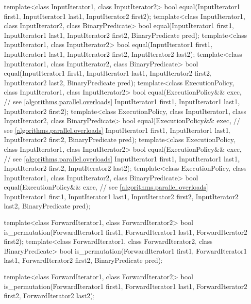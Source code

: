 \begin{codeblock}
{  template<class InputIterator1, class InputIterator2>
    bool equal(InputIterator1 first1, InputIterator1 last1,
               InputIterator2 first2);
  template<class InputIterator1, class InputIterator2, class BinaryPredicate>
    bool equal(InputIterator1 first1, InputIterator1 last1,
               InputIterator2 first2, BinaryPredicate pred);
  template<class InputIterator1, class InputIterator2>
    bool equal(InputIterator1 first1, InputIterator1 last1,
               InputIterator2 first2, InputIterator2 last2);
  template<class InputIterator1, class InputIterator2, class BinaryPredicate>
    bool equal(InputIterator1 first1, InputIterator1 last1,
               InputIterator2 first2, InputIterator2 last2,
               BinaryPredicate pred);
  template<class ExecutionPolicy, class InputIterator1, class InputIterator2>
    bool equal(ExecutionPolicy&& exec, // see \ref{algorithms.parallel.overloads}
               InputIterator1 first1, InputIterator1 last1,
               InputIterator2 first2);
  template<class ExecutionPolicy, class InputIterator1, class InputIterator2,
           class BinaryPredicate>
    bool equal(ExecutionPolicy&& exec, // see \ref{algorithms.parallel.overloads}
               InputIterator1 first1, InputIterator1 last1,
               InputIterator2 first2, BinaryPredicate pred);
  template<class ExecutionPolicy, class InputIterator1, class InputIterator2>
    bool equal(ExecutionPolicy&& exec, // see \ref{algorithms.parallel.overloads}
               InputIterator1 first1, InputIterator1 last1,
               InputIterator2 first2, InputIterator2 last2);
  template<class ExecutionPolicy, class InputIterator1, class InputIterator2,
           class BinaryPredicate>
    bool equal(ExecutionPolicy&& exec, // see \ref{algorithms.parallel.overloads}
               InputIterator1 first1, InputIterator1 last1,
               InputIterator2 first2, InputIterator2 last2,
               BinaryPredicate pred);

  template<class ForwardIterator1, class ForwardIterator2>
    bool is_permutation(ForwardIterator1 first1, ForwardIterator1 last1,
                        ForwardIterator2 first2);
  template<class ForwardIterator1, class ForwardIterator2, class BinaryPredicate>
    bool is_permutation(ForwardIterator1 first1, ForwardIterator1 last1,
                        ForwardIterator2 first2, BinaryPredicate pred);

  template<class ForwardIterator1, class ForwardIterator2>
    bool is_permutation(ForwardIterator1 first1, ForwardIterator1 last1,
                        ForwardIterator2 first2, ForwardIterator2 last2);

}
\end{codeblock}

